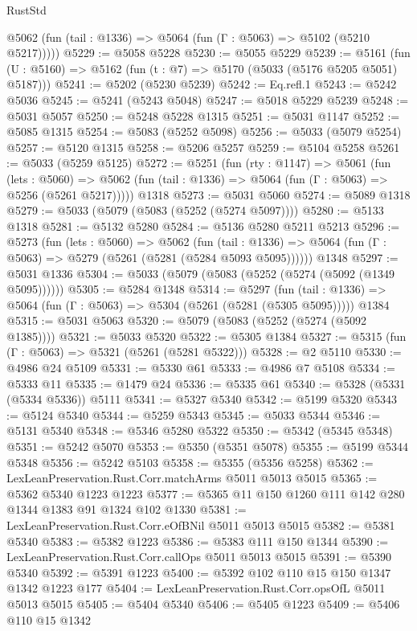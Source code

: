 \begin{lexlean}{RustStd}
\begin{coremodule}
      @5062 (fun (tail : @1336) => @5064 (fun (Γ : @5063) => @5102 (@5210 @5217)))))
@5229 := @5058 @5228
@5230 := @5055 @5229
@5239 := @5161 (fun (U : @5160) => @5162 (fun (t : @7) => @5170 (@5033 (@5176 @5205 @5051) @5187)))
@5241 := @5202 (@5230 @5239)
@5242 := Eq.refl.{1}
@5243 := @5242 @5036
@5245 := @5241 (@5243 @5048)
@5247 := @5018 @5229 @5239
@5248 := @5031 @5057
@5250 := @5248 @5228 @1315
@5251 := @5031 @1147
@5252 := @5085 @1315
@5254 := @5083 (@5252 @5098)
@5256 := @5033 (@5079 @5254)
@5257 := @5120 @1315
@5258 := @5206 @5257
@5259 := @5104 @5258
@5261 := @5033 (@5259 @5125)
@5272 := @5251
    (fun (rty : @1147) =>
    @5061
      (fun (lets : @5060) =>
      @5062 (fun (tail : @1336) => @5064 (fun (Γ : @5063) => @5256 (@5261 @5217)))))
    @1318
@5273 := @5031 @5060
@5274 := @5089 @1318
@5279 := @5033 (@5079 (@5083 (@5252 (@5274 @5097))))
@5280 := @5133 @1318
@5281 := @5132 @5280
@5284 := @5136 @5280 @5211 @5213
@5296 := @5273
    (fun (lets : @5060) =>
    @5062
      (fun (tail : @1336) => @5064 (fun (Γ : @5063) => @5279 (@5261 (@5281 (@5284 @5093 @5095))))))
    @1348
@5297 := @5031 @1336
@5304 := @5033 (@5079 (@5083 (@5252 (@5274 (@5092 (@1349 @5095))))))
@5305 := @5284 @1348
@5314 := @5297
    (fun (tail : @1336) => @5064 (fun (Γ : @5063) => @5304 (@5261 (@5281 (@5305 @5095)))))
    @1384
@5315 := @5031 @5063
@5320 := @5079 (@5083 (@5252 (@5274 (@5092 @1385))))
@5321 := @5033 @5320
@5322 := @5305 @1384
@5327 := @5315 (fun (Γ : @5063) => @5321 (@5261 (@5281 @5322)))
@5328 := @2 @5110
@5330 := @4986 @24 @5109
@5331 := @5330 @61
@5333 := @4986 @7 @5108
@5334 := @5333 @11
@5335 := @1479 @24
@5336 := @5335 @61
@5340 := @5328 (@5331 (@5334 @5336)) @5111
@5341 := @5327 @5340
@5342 := @5199 @5320
@5343 := @5124 @5340
@5344 := @5259 @5343
@5345 := @5033 @5344
@5346 := @5131 @5340
@5348 := @5346 @5280 @5322
@5350 := @5342 (@5345 @5348)
@5351 := @5242 @5070
@5353 := @5350 (@5351 @5078)
@5355 := @5199 @5344 @5348
@5356 := @5242 @5103
@5358 := @5355 (@5356 @5258)
@5362 := LexLeanPreservation.Rust.Corr.matchArms @5011 @5013 @5015
@5365 := @5362 @5340 @1223 @1223
@5377 := @5365 @11 @150 @1260 @111 @142 @280 @1344 @1383 @91 @1324 @102 @1330
@5381 := LexLeanPreservation.Rust.Corr.eOfBNil @5011 @5013 @5015
@5382 := @5381 @5340
@5383 := @5382 @1223
@5386 := @5383 @111 @150 @1344
@5390 := LexLeanPreservation.Rust.Corr.callOps @5011 @5013 @5015
@5391 := @5390 @5340
@5392 := @5391 @1223
@5400 := @5392 @102 @110 @15 @150 @1347 @1342 @1223 @177
@5404 := LexLeanPreservation.Rust.Corr.opsOfL @5011 @5013 @5015
@5405 := @5404 @5340
@5406 := @5405 @1223
@5409 := @5406 @110 @15 @1342

\end{coremodule}
\end{lexlean}
